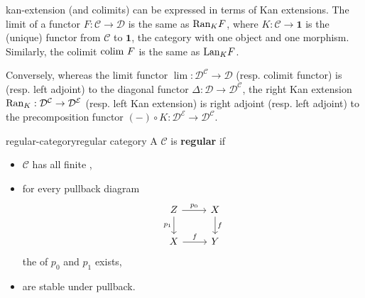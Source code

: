 \begin{example}{kan-extension}
     (and colimits) can be expressed in terms of Kan extensions. The limit of a functor $F : \mathcal{C} \to \mathcal{D}$ is the same as $\textup{Ran}_K F$, where $K : \mathcal{C} \to \textbf{1}$ is the (unique) functor from $\mathcal{C}$ to $\textbf{1}$, the category with one object and one morphism. Similarly, the colimit $\textup{colim } F$ is the same as $\textup{Lan}_K F$.
    
    Conversely, whereas the limit functor $\lim : \mathcal{D}^\mathcal{C} \to \mathcal{D}$ (resp. colimit functor) is  (resp. left adjoint) to the diagonal functor $\Delta : \mathcal{D} \to \mathcal{D}^\mathcal{C}$, the right Kan extension $\textup{Ran}_K : \mathcal{D}^\mathcal{C} \to \mathcal{D}^\mathcal{E}$ (resp. left Kan extension) is right adjoint (resp. left adjoint) to the precomposition functor $(-) \circ K : \mathcal{D}^\mathcal{E} \to \mathcal{D}^\mathcal{C}$.
\end{example}

\begin{topic}{regular-category}{regular category}
    A  $\mathcal{C}$ is \textbf{regular} if
    \begin{itemize}
        \item $\mathcal{C}$ has all finite ,
        \item for every pullback diagram
        \[ \begin{tikzcd} Z \arrow[swap]{d}{p_1} \arrow{r}{p_0} & X \arrow{d}{f} \\ X \arrow{r}{f} & Y \end{tikzcd} \]
        the  of $p_0$ and $p_1$ exists,
        \item {} are stable under pullback.
    \end{itemize}
\end{topic}

